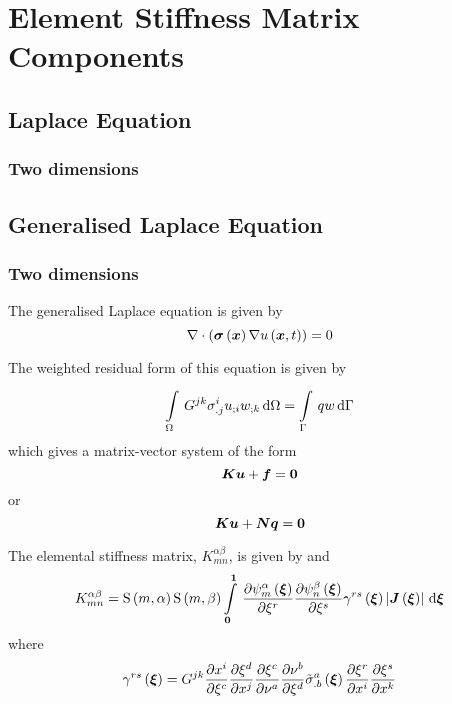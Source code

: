 \chapter{Element Stiffness Matrix Components}
\label{app:ElementStiffnessMatrixComponents}

\section{Laplace Equation}
\label{sec:ElementStiffnessMatrixLaplace}

\subsection{Two dimensions}
\label{subsec:ElementStiffnessMatrixLaplace2D}

\section{Generalised Laplace Equation}
\label{sec:ElementStiffnessMatrixGenLaplace}

\subsection{Two dimensions}
\label{subsec:ElementStiffnessMatrixGenLaplace2D}

The generalised Laplace equation is given by  \ie
\begin{equation}
  \divergence{}{\pbrac{\fnof{\tensor{\sigma}}{\vectr{x}}\gradient{}{\fnof{u}{\vectr{x},t}}}}=0  
\end{equation}

The weighted residual form of this equation is given by  \ie
\begin{equation}
  \gint{\Omega}{}{G^{jk}\sigma^{i}_{.j}\covarderiv{u}{i}\covarderiv{w}{k}}{\Omega}
  = \gint{\Gamma}{}{qw}{\Gamma}
\end{equation}
which gives a matrix-vector system of the form
\begin{equation}
  \matr{K}\vect{u}+\vect{f}=\vect{0}
\end{equation}
or
\begin{equation}
  \matr{K}\vect{u}+\matr{N}\vectr{q}=\vect{0}
\end{equation}

The elemental stiffness matrix, $K^{\alpha\beta}_{mn}$, is given by
 and
 \ie
\begin{equation}
  K^{\alpha\beta}_{mn}=\gsf{m}{\alpha}\gsf{m}{\beta}
  \gint{\vectr{0}}{\vectr{1}}{\delby{\gbfn{m}{\alpha}{\vectr{\xi}}}{\xi^{r}}
    \delby{\gbfn{n}{\beta}{\vectr{\xi}}}{\xi^{s}}\fnof{\gamma^{rs}}{\vectr{\xi}}
    \abs{\fnof{\matr{J}}{\vectr{\xi}}}}{\vectr{\xi}}
\end{equation}
where
\begin{equation}
   \gamma^{rs}\left(  \boldsymbol{\xi}  \right) =G^{jk} \dfrac{\partial x^{i}}{\partial \xi^{c}} 
   \dfrac{\partial \xi^{d}}{\partial x^{j}}  \dfrac{\partial \xi^{c}}{\partial \nu^{a}}  \dfrac{\partial \nu^{b}}{\partial \xi^{d}} 
   {\tilde{\sigma}}^{a}_{.b}\left(  \boldsymbol{\xi}  \right)  \dfrac{\partial \xi^{r}}{\partial x^{i}}  \dfrac{\partial \xi^{s}}{\partial x^{k}} 
\end{equation}

